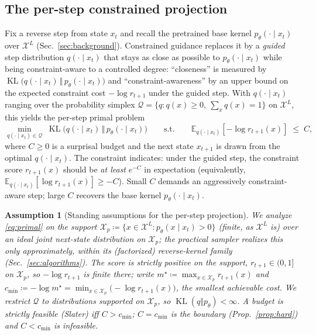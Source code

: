 \documentclass{article}
\newtheorem{assumption}{Assumption}
\DeclareMathOperator{\KL}{KL}
\newcommand{\E}{\mathbb{E}}
\newcommand{\X}{\mathcal{X}}
\newcommand{\Q}{\mathcal{Q}}
\begin{document}
\subsection{The per-step constrained projection}
\label{sec:perstep}
Fix a reverse step from state $x_t$ and recall the pretrained base kernel $p_\theta(\cdot\mid x_t)$ over $\X^L$ (Sec.~\ref{sec:background}). Constrained guidance replaces it by a \emph{guided} step distribution $q(\cdot\mid x_t)$ that stays as close as possible to $p_\theta(\cdot\mid x_t)$ while being constraint-aware to a controlled degree: ``closeness'' is measured by $\KL\big(q(\cdot\mid x_t)\,\Vert\,p_\theta(\cdot\mid x_t)\big)$ and ``constraint-awareness'' by an upper bound on the expected constraint cost $-\log r_{t+1}$ under the guided step. With $q(\cdot\mid x_t)$ ranging over the probability simplex $\Q=\{q:q(x)\ge0,\ \sum_x q(x)=1\}$ on $\X^L$, this yields the per-step primal problem
\begin{equation}
\label{eq:primal}
\min_{q(\cdot\mid x_t)\in\Q}\; \KL\big(q(\cdot\mid x_t)\,\big\Vert\, p_\theta(\cdot\mid x_t)\big)
\qquad\text{s.t.}\qquad
\E_{q(\cdot\mid x_t)}\!\left[-\log r_{t+1}(x)\right]\;\le\;C,
\end{equation}
where $C\ge 0$ is a surprisal budget and the next state $x_{t+1}$ is drawn from the optimal $q(\cdot\mid x_t)$. The constraint indicates: under the guided step, the constraint score $r_{t+1}(x)$ should be \emph{at least} $e^{-C}$ in expectation (equivalently, $\E_{q(\cdot\mid x_t)}[\log r_{t+1}(x)]\ge -C$). Small $C$ demands an aggressively constraint-aware step; large $C$ recovers the base kernel $p_\theta(\cdot\mid x_t)$.

\begin{assumption}[Standing assumptions for the per-step projection]
\label{ass:standing}
We analyze \eqref{eq:primal} on the support $\X_p\coloneqq\{x\in\X^L:p_\theta(x\mid x_t)>0\}$ (finite, as $\X^L$ is) over an \emph{ideal joint} next-state distribution on $\X_p$; the practical sampler realizes this only approximately, within its (factorized) reverse-kernel family (Sec.~\ref{sec:algorithms}). The score is strictly positive on the support, $r_{t+1}\in(0,1]$ on $\X_p$, so $-\log r_{t+1}$ is finite there; write $m^\star\coloneqq\max_{x\in\X_p}r_{t+1}(x)$ and $c_{\min}\coloneqq-\log m^\star=\min_{x\in\X_p}\!\big(-\log r_{t+1}(x)\big)$, the smallest achievable cost. We restrict $\Q$ to distributions supported on $\X_p$, so $\KL(q\Vert p_\theta)<\infty$. A budget is \emph{strictly feasible} (Slater) iff $C>c_{\min}$; $C=c_{\min}$ is the boundary (Prop.~\ref{prop:hard}) and $C<c_{\min}$ is infeasible.
\end{assumption}
\end{document}
